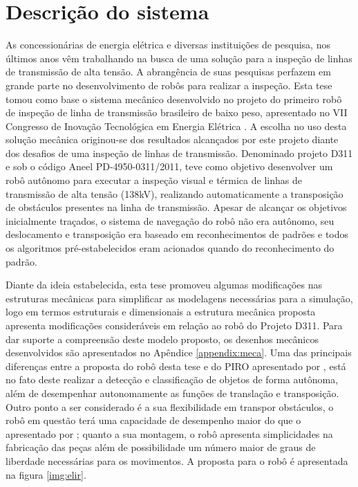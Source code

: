 \section{Descrição do sistema}
\label{sec:desc}
As concessionárias de energia elétrica e diversas instituições de pesquisa, nos últimos anos vêm trabalhando na busca de uma solução para a inspeção de linhas de transmissão de alta tensão. A abrangência de suas pesquisas perfazem em grande parte no desenvolvimento de robôs para realizar a inspeção. 
Esta tese tomou como base o sistema mecânico desenvolvido no projeto do primeiro robô de inspeção de linha de transmissão brasileiro de baixo peso, apresentado no VII Congresso de Inovação Tecnológica em Energia Elétrica \cite{mourao2015robolinhas}.
A escolha no uso desta solução mecânica originou-se dos resultados alcançados por este projeto diante dos desafios de uma inspeção de linhas de transmissão. Denominado projeto D311 e sob o código Aneel PD-4950-0311/2011, teve como objetivo desenvolver um robô autônomo para executar a inspeção visual e térmica de linhas de transmissão de alta tensão (138kV), realizando automaticamente a transposição de obstáculos presentes na linha de transmissão.
Apesar de alcançar os objetivos inicialmente traçados, o sistema de navegação do robô não era autônomo, seu deslocamento e transposição era baseado em reconhecimentos de padrões e todos os algoritmos pré-estabelecidos eram acionados quando do reconhecimento do padrão.

Diante da ideia estabelecida, esta tese promoveu algumas modificações nas estruturas mecânicas para simplificar as modelagens necessárias para a simulação, logo em termos estruturais e dimensionais a estrutura mecânica proposta apresenta modificações consideráveis em relação ao robô do Projeto D311. Para dar suporte a compreensão deste modelo proposto, os desenhos mecânicos desenvolvidos são apresentados no Apêndice \ref{appendix:meca}. Uma das principais diferenças entre a proposta do robô desta tese e do PIRO apresentado por , está no fato deste realizar a detecção e classificação de objetos de forma autônoma, além de desempenhar autonomamente as funções de translação e transposição. Outro ponto a ser considerado é a sua flexibilidade em transpor obstáculos, o robô em questão terá uma capacidade de desempenho maior do que o apresentado por \cite{mourao2015robolinhas}; quanto a sua montagem, o robô apresenta simplicidades na fabricação das peças além de possibilidade um número maior de graus de liberdade necessárias para os movimentos. A proposta para o robô é apresentada na figura \ref{img:elir}.

